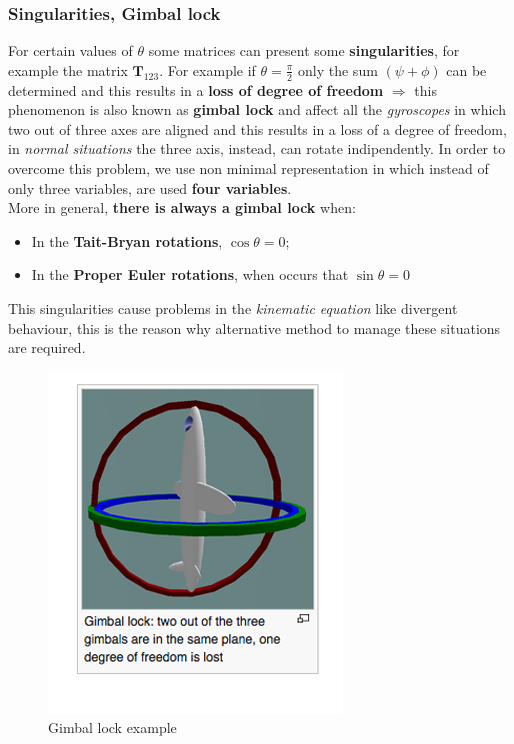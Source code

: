 {\color{blue}\subsubsection{Singularities, Gimbal lock}}
For certain values of $\theta$ some matrices can present some \textbf{singularities}, for example the matrix $\mathbf{T}_{123}$. For example if $\theta=\frac{\pi}{2}$ only the sum $(\psi+\phi)$ can be determined and this results in a \textbf{loss of degree of freedom} $\Longrightarrow$ this phenomenon is also known as \textbf{gimbal lock} and affect all the \textit{gyroscopes} in which two out of three axes are aligned and this results in a loss of a degree of freedom, in \textit{normal situations} the three axis, instead, can rotate indipendently.
In order to overcome this problem, we use non minimal representation in which instead of only three variables, are used \textbf{four variables}.\\
More in general, \textbf{there is always a gimbal lock} when: 
\begin{itemize}
    \itemsep0em
    \item[\ding{70}] In the \textbf{Tait-Bryan rotations}, $\cos\theta=0$;
    \item[\ding{70}] In the \textbf{Proper Euler rotations}, when occurs that $\sin\theta=0$   
\end{itemize}
This singularities cause problems in the \textit{kinematic equation} like divergent behaviour, this is the reason why alternative method to manage these situations are required.

\begin{figure}[h]  
    \centering
    \includegraphics[scale=1.3]{AerospaceApplications/images/gimbal_lock.png}
    \caption{Gimbal lock example}
\end{figure}

